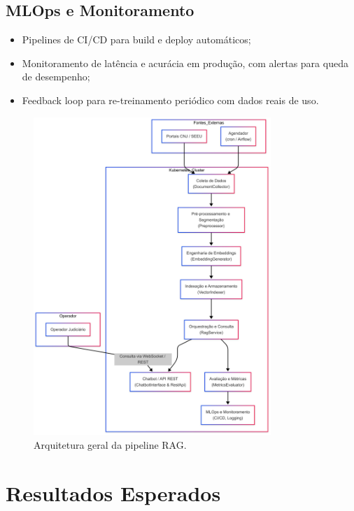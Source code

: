 \section{MLOps e Monitoramento}
\begin{itemize}[label=\textbullet]
  \item Pipelines de CI/CD para build e deploy automáticos;
  \item Monitoramento de latência e acurácia em produção, com alertas para queda de desempenho;
  \item Feedback loop para re-treinamento periódico com dados reais de uso.
\end{itemize}

\begin{figure}[h!]
  \centering
  \includegraphics[width=0.8\textwidth]{04-figuras/arquitetura_pipeline.png}
  \caption{Arquitetura geral da pipeline RAG.}
  \label{fig:arquitetura_pipeline}
\end{figure}



\chapter{Resultados Esperados}
\label{chap:resultados}

